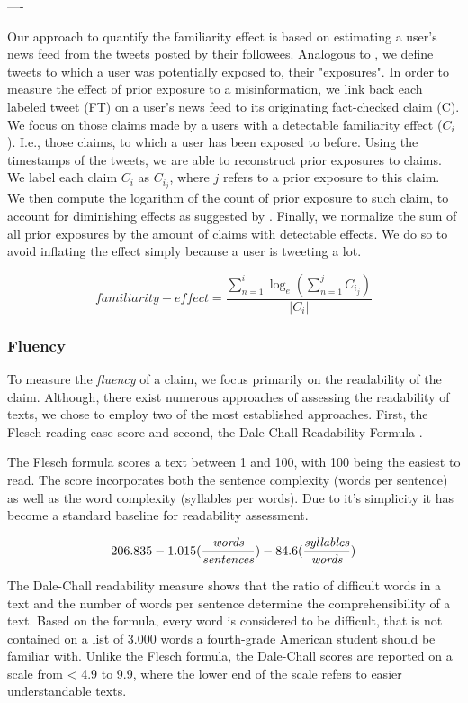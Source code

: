 \documentclass[
10pt, %
a4paper, %
oneside, %
headinclude,footinclude, %
] {book}%
\begin{document}
----


Our approach to quantify the familiarity effect is based on estimating a user's news feed from the tweets posted by their followees. Analogous to \cite{grinberg2019partisanship}, we define tweets to which a user was potentially exposed to, their "exposures". In order to measure the effect of prior exposure to a misinformation, we link back each labeled tweet (FT) on a user's news feed to its originating fact-checked claim (C). We focus on those claims made by a users with a detectable familiarity effect ($C_i$). I.e., those claims, to which a user has been exposed to before. Using the timestamps of the tweets, we are able to reconstruct prior exposures to claims. We label each claim $C_i$ as $C_i_j$, where $j$ refers to a prior exposure to this claim. We then compute the logarithm of the count of prior exposure to such claim, to account for diminishing effects as suggested by \cite{hassan2021effects}. Finally, we normalize the sum of all prior exposures by the amount of claims with detectable effects. We do so to avoid inflating the effect simply because a user is tweeting a lot.


\[familiarity-effect = \frac{\displaystyle \sum_{n=1}^{i}\log_{e}(\sum_{n=1}^{j}C_i_j)}{|C_i|}\]


\subsubsection{Fluency}

To measure the \emph{fluency} of a claim, we focus primarily on the readability of the claim. Although, there exist numerous approaches of assessing the readability of texts, we chose to employ two of the most established approaches. First, the Flesch reading-ease score \citep{flesch1948new} and second, the Dale-Chall Readability Formula \citep{dale1948formula, chall1995readability}. 

The Flesch formula scores a text between 1 and 100, with 100 being the easiest to read. The score incorporates both the sentence complexity (words per sentence) as well as the word complexity (syllables per words). Due to it's simplicity it has become a standard baseline for readability assessment. 

\[ 206.835 - 1.015 (\frac{\emph{words}}{\emph{sentences}}) - 84.6 (\frac{\emph{syllables}}{\emph{words}}) \]

The Dale-Chall readability measure shows that the ratio of difficult words in a text and the number of words per sentence determine the comprehensibility of a text. Based on the formula, every word is considered to be difficult, that is not contained on a list of 3.000 words a fourth-grade American student should be familiar with. Unlike the Flesch formula, the Dale-Chall scores are reported on a scale from < 4.9 to 9.9, where the lower end of the scale refers to easier understandable texts.
\end{document}
